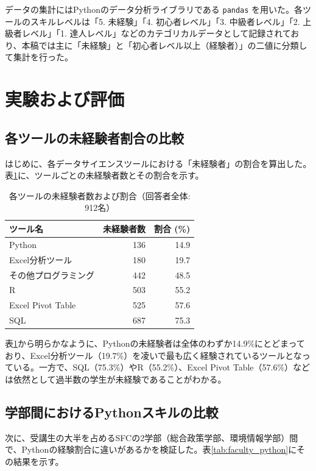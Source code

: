 \documentclass[uplatex, dvipdfmx, a4paper, 11pt]{jsarticle}
\begin{document}
データの集計にはPythonのデータ分析ライブラリである \texttt{pandas} を用いた。各ツールのスキルレベルは「5. 未経験」「4. 初心者レベル」「3. 中級者レベル」「2. 上級者レベル」「1. 達人レベル」などのカテゴリカルデータとして記録されており、本稿では主に「未経験」と「初心者レベル以上（経験者）」の二値に分類して集計を行った。

\section{実験および評価}

\subsection{各ツールの未経験者割合の比較}
はじめに、各データサイエンスツールにおける「未経験者」の割合を算出した。表\ref{tab:unexperienced}に、ツールごとの未経験者数とその割合を示す。

\begin{table}[H]
    \centering
    \caption{各ツールの未経験者数および割合（回答者全体: 912名）}
    \label{tab:unexperienced}
    \begin{tabular}{lrr}
        \toprule
        ツール名              & 未経験者数 & 割合 (\%) \\
        \midrule
        Python            & 136   & 14.9    \\
        Excel分析ツール        & 180   & 19.7    \\
        その他プログラミング        & 442   & 48.5    \\
        R                 & 503   & 55.2    \\
        Excel Pivot Table & 525   & 57.6    \\
        SQL               & 687   & 75.3    \\
        \bottomrule
    \end{tabular}
\end{table}

表\ref{tab:unexperienced}から明らかなように、Pythonの未経験者は全体のわずか14.9\%にとどまっており、Excel分析ツール（19.7\%）を凌いで最も広く経験されているツールとなっている。一方で、SQL（75.3\%）やR（55.2\%）、Excel Pivot Table（57.6\%）などは依然として過半数の学生が未経験であることがわかる。

\subsection{学部間におけるPythonスキルの比較}
次に、受講生の大半を占めるSFCの2学部（総合政策学部、環境情報学部）間で、Pythonの経験割合に違いがあるかを検証した。表\ref{tab:faculty_python}にその結果を示す。
\end{document}
